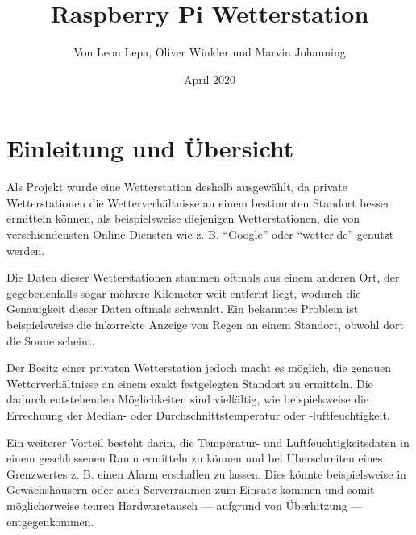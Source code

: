 \documentclass[a4paper,12pt]{article}
\begin{document}
\title{\textbf{Raspberry Pi Wetterstation}}
\author{Von Leon Lepa, Oliver Winkler und Marvin Johanning}
\date{April 2020}
\maketitle
{}
\pagebreak

\tableofcontents
\pagebreak

\setlength{\headheight}{15.2pt}
\pagestyle{fancy}
\renewcommand{\headrulewidth}{2pt}
\renewcommand{\footrulewidth}{2pt}
\fancyhead[R]{\nouppercase\leftmark}

\section{Einleitung und Übersicht}
Als Projekt wurde eine Wetterstation deshalb ausgewählt, da private Wetterstationen die Wetterverhältnisse an einem bestimmten Standort besser ermitteln können, als beispielsweise diejenigen Wetterstationen, die von verschiendensten Online-Diensten wie z. B. "`Google"' oder "`wetter.de"' genutzt werden.

Die Daten dieser Wetterstationen stammen oftmals aus einem anderen Ort, der gegebenenfalls sogar mehrere Kilometer weit entfernt liegt, wodurch die Genauigkeit dieser Daten oftmals schwankt. Ein bekanntes Problem ist beispielsweise die inkorrekte Anzeige von Regen an einem Standort, obwohl dort die Sonne scheint.

Der Besitz einer privaten Wetterstation jedoch macht es möglich, die genauen Wetterverhältnisse an einem exakt festgelegten Standort zu ermitteln. Die dadurch entstehenden Möglichkeiten sind vielfältig, wie beispielsweise die Errechnung der Median- oder Durchschnittstemperatur oder -luftfeuchtigkeit.

Ein weiterer Vorteil besteht darin, die Temperatur- und Luftfeuchtigkeitsdaten in einem geschlossenen Raum ermitteln zu können und bei Überschreiten eines Grenzwertes z. B. einen Alarm erschallen zu lassen. Dies könnte beispielsweise in Gewächshäusern oder auch Serverräumen zum Einsatz kommen und somit möglicherweise teuren Hardwaretausch — aufgrund von Überhitzung — entgegenkommen.
\end{document}
